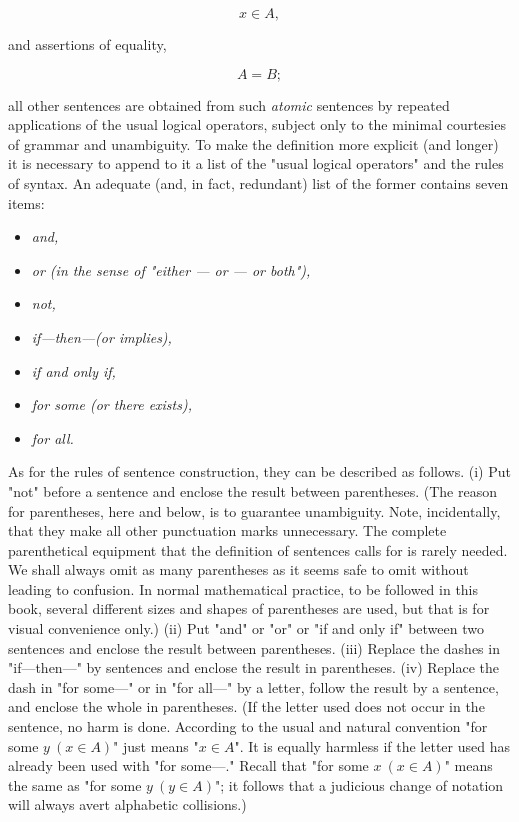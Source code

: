 \begin{equation*}
x \in A,
\end{equation*}

and assertions of equality, 

\begin{equation*}
A = B;
\end{equation*}

all other sentences are obtained from such \textit{atomic} sentences by repeated applications of the usual logical operators, subject only to the minimal courtesies of grammar and unambiguity. To make the definition more explicit (and longer) it is necessary to append to it a list of the "usual logical operators" and the rules of syntax. An adequate (and, in fact, redundant) list of the former contains seven items:

\begin{itemize}[label={}]
  \itemsep0em
  \item \textit{and,}
  \item \textit{or (in the sense of "either — or — or both"), }
  \item \textit{not,}
  \item \textit{if—then—(or implies),}
  \item \textit{if and only if,}
  \item \textit{for some (or there exists),}
  \item \textit{for all.}
\end{itemize}

As for the rules of sentence construction, they can be described as follows. (i) Put "not" before a sentence and enclose the result between parentheses. (The reason for parentheses, here and below, is to guarantee unambiguity. Note, incidentally, that they make all other punctuation marks unnecessary. The complete parenthetical equipment that the definition of sentences calls for is rarely needed. We shall always omit as many parentheses as it seems safe to omit without leading to confusion. In normal mathematical practice, to be followed in this book, several different sizes and shapes of parentheses are used, but that is for visual convenience only.) (ii) Put "and" or "or" or "if and only if" between two sentences and enclose the result between parentheses. (iii) Replace the dashes in "if—then—" by sentences and enclose the result in parentheses. (iv) Replace the dash in "for some—" or in "for all—" by a letter, follow the result by a sentence, and enclose the whole in parentheses. (If the letter used does not occur in the sentence, no harm is done. According to the usual and natural convention "for some $y\ (x \in A)$" just means "$ x \in A$". It is equally harmless if the letter used has already been used with "for some—." Recall that "for some $x\ (x \in A)$" means the same as  "for some $y\ (y \in A)$"; it follows that a judicious change of notation will always avert alphabetic collisions.)


